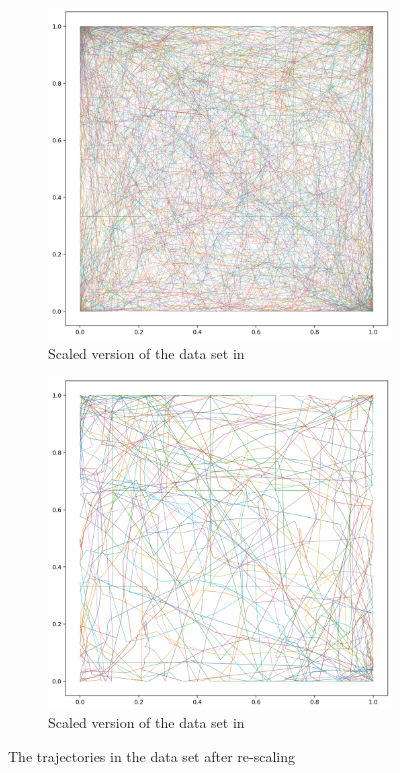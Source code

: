 \begin{figure}[h!]
\centering
\begin{subfigure}{.45\textwidth}
    \centering
    \includegraphics[width=\textwidth]{figs/traj/REAL_TRUNC_SCL.png}
    \caption{Scaled version of the data set in \newline{}}
\end{subfigure}
\hfill
\begin{subfigure}{.45\textwidth}
    \centering
    \includegraphics[width=\textwidth]{figs/traj/REAL_TRUNC_SCL_MINI.png}
    \caption{Scaled version of the data set in\newline {}}
\end{subfigure}
\caption{The trajectories in the data set after re-scaling}
\label{fig:scl-datasets}
\end{figure}



